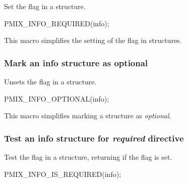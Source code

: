 \summary

Set the  flag in a  structure.

\cspecificstart
\begin{codepar}
PMIX_INFO_REQUIRED(info);
\end{codepar}
\cspecificend

\begin{arglist}
\end{arglist}

This macro simplifies the setting of the  flag in  structures.

\subsubsection{Mark an info structure as optional}

\summary
Unsets the  flag in a  structure.

\cspecificstart
\begin{codepar}
PMIX_INFO_OPTIONAL(info);
\end{codepar}
\cspecificend

\begin{arglist}
\end{arglist}

This macro simplifies marking a  structure as \textit{optional}.

\subsubsection{Test an info structure for \textit{required} directive}

\summary

Test the  flag in a  structure, returning  if the flag is set.

\cspecificstart
\begin{codepar}
PMIX_INFO_IS_REQUIRED(info);
\end{codepar}
\cspecificend

\begin{arglist}
\end{arglist}

